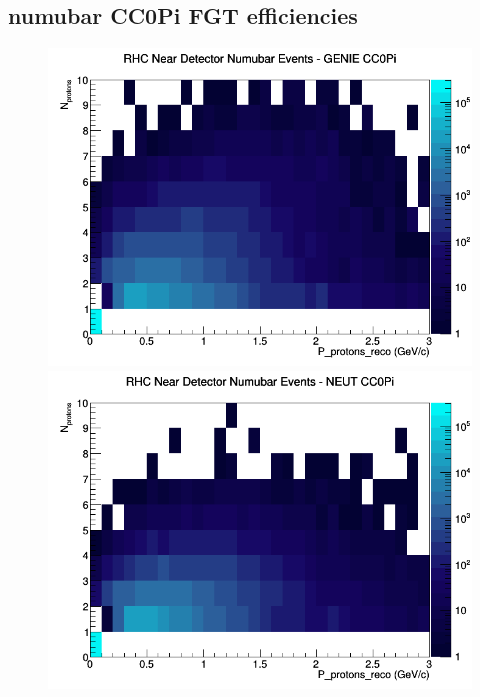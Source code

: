 \subsection{numubar CC0Pi FGT efficiencies}
\begin{figure}[h]
\includegraphics[width=\linewidth]{eff_N_P/FGT/protons/CC0Pi_RHC_ND_numubar_N_P_GENIE.png}
\endminipage
{}
\includegraphics[width=\linewidth]{eff_N_P/FGT/protons/CC0Pi_RHC_ND_numubar_N_P_NEUT.png}
\endminipage
{}

\end{figure}
